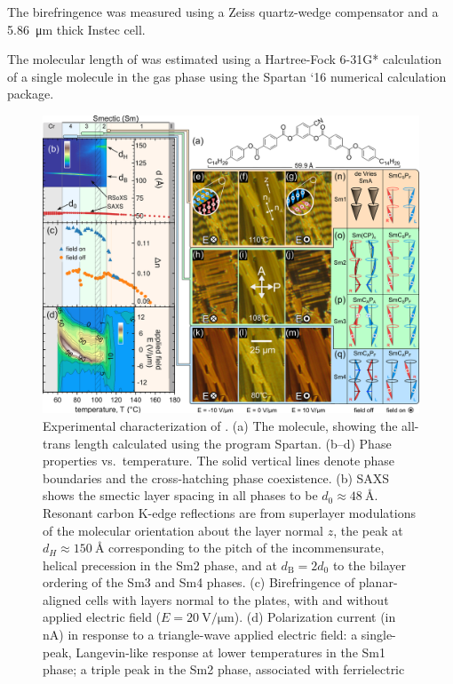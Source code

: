 \documentclass[aagreenthesis]{subfiles}
\begin{document}
The birefringence was measured using a Zeiss quartz-wedge compensator and a
\SI{5.86}{\micro\metre} thick Instec cell.

The molecular length of  was estimated using a Hartree-Fock 6-31G*
calculation of a single molecule in the gas phase using the Spartan ‘16
numerical calculation package.


\begin{figure}
    \centering
    \includegraphics[width=.9\textwidth]{figs/pal30/fromPaper/finalFigs/Figure1v3.png}
    \caption{\label{fig:main}
        Experimental characterization of . (a) The  molecule, showing the
        all-trans length calculated using the program Spartan. (b--d) Phase properties vs.\ temperature. The solid vertical lines denote phase boundaries and the cross-hatching phase coexistence.
    (b) SAXS shows the smectic layer spacing in all
    phases to be $d_0 \approx \SI{48}{\angstrom}$. Resonant carbon K-edge
    reflections are from superlayer
    modulations of the molecular orientation about the layer normal $z$, the peak
    at $d_H \approx \SI{150}{\angstrom}$ corresponding to the pitch of the incommensurate, helical precession in the Sm2 phase, and at
    $d_\text{B}=2d_0$ to the bilayer ordering of the Sm3 and Sm4 phases.
    (c) Birefringence of planar-aligned cells with layers normal to the plates, with and without applied electric
    field ($E = \SI{20}{\volt\per\micro\metre}$).
    (d) Polarization current (in nA) in response to a triangle-wave applied electric field:
    a single-peak, Langevin-like response at lower
    temperatures in the Sm1
    phase; a triple peak in the Sm2 phase, associated with ferrielectric
}
\end{figure}
\end{document}

